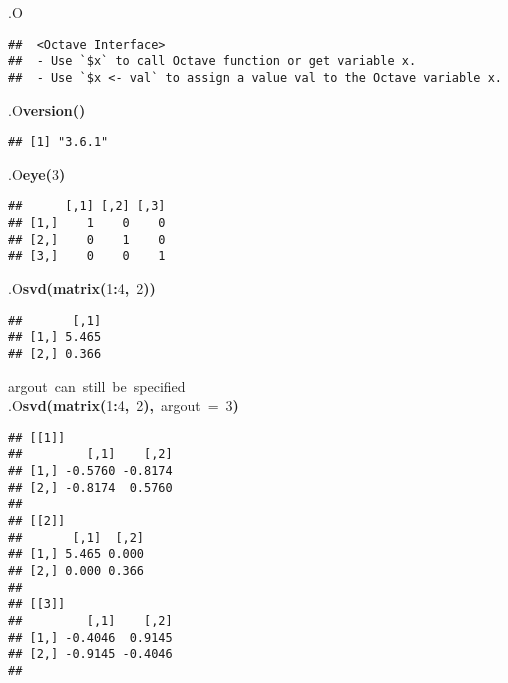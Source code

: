 \documentclass[english,10pt,a4paper]{article}\usepackage{graphicx, color}
\makeatletter
\newcommand{\hlnumber}[1]{\textcolor[rgb]{0,0,0}{#1}}%
\newcommand{\hlfunctioncall}[1]{\textcolor[rgb]{0.501960784313725,0,0.329411764705882}{\textbf{#1}}}%
\newcommand{\hlkeyword}[1]{\textcolor[rgb]{0,0,0}{\textbf{#1}}}%
\newcommand{\hlargument}[1]{\textcolor[rgb]{0.690196078431373,0.250980392156863,0.0196078431372549}{#1}}%
\newcommand{\hlcomment}[1]{\textcolor[rgb]{0.180392156862745,0.6,0.341176470588235}{#1}}%
\newcommand{\hlsymbol}[1]{\textcolor[rgb]{0,0,0}{#1}}%
\newcommand{\hlstd}[1]{\textcolor[rgb]{0,0,0}{#1}}%
\newenvironment{kframe}{%
 \def\FrameCommand##1{\hskip\@totalleftmargin \hskip-\fboxsep
 \colorbox{shadecolor}{##1}\hskip-\fboxsep
     \hskip-\linewidth \hskip-\@totalleftmargin \hskip\columnwidth}%
 \MakeFramed {\advance\hsize-\width
   \@totalleftmargin\z@ \linewidth\hsize
   \@setminipage}}%
 {\par\unskip\endMakeFramed}
\newenvironment{knitrout}{}{} %
\makeatother
\begin{document}
\begin{knitrout}
\color{fgcolor}\begin{kframe}
\begin{flushleft}
\ttfamily\noindent
\hlsymbol{.O}\mbox{}
\normalfont
\end{flushleft}
\begin{verbatim}
##  <Octave Interface>
##  - Use `$x` to call Octave function or get variable x.
##  - Use `$x <- val` to assign a value val to the Octave variable x.
\end{verbatim}
\begin{flushleft}
\ttfamily\noindent
\hlsymbol{.O}\hlkeyword{\usebox{\hlnormalsizeboxdollar}}\hlfunctioncall{version}\hlkeyword{(}\hlkeyword{)}\mbox{}
\normalfont
\end{flushleft}
\begin{verbatim}
## [1] "3.6.1"
\end{verbatim}
\begin{flushleft}
\ttfamily\noindent
\hlsymbol{.O}\hlkeyword{\usebox{\hlnormalsizeboxdollar}}\hlfunctioncall{eye}\hlkeyword{(}\hlnumber{3}\hlkeyword{)}\mbox{}
\normalfont
\end{flushleft}
\begin{verbatim}
##      [,1] [,2] [,3]
## [1,]    1    0    0
## [2,]    0    1    0
## [3,]    0    0    1
\end{verbatim}
\begin{flushleft}
\ttfamily\noindent
\hlsymbol{.O}\hlkeyword{\usebox{\hlnormalsizeboxdollar}}\hlfunctioncall{svd}\hlkeyword{(}\hlfunctioncall{matrix}\hlkeyword{(}\hlnumber{1}\hlkeyword{:}\hlnumber{4}\hlkeyword{,}{\ }\hlnumber{2}\hlkeyword{)}\hlkeyword{)}\mbox{}
\normalfont
\end{flushleft}
\begin{verbatim}
##       [,1]
## [1,] 5.465
## [2,] 0.366
\end{verbatim}
\begin{flushleft}
\ttfamily\noindent
\hlcomment{\usebox{\hlnormalsizeboxhash}{\ }argout{\ }can{\ }still{\ }be{\ }specified}\hspace*{\fill}\\
\hlstd{}\hlsymbol{.O}\hlkeyword{\usebox{\hlnormalsizeboxdollar}}\hlfunctioncall{svd}\hlkeyword{(}\hlfunctioncall{matrix}\hlkeyword{(}\hlnumber{1}\hlkeyword{:}\hlnumber{4}\hlkeyword{,}{\ }\hlnumber{2}\hlkeyword{)}\hlkeyword{,}{\ }\hlargument{argout}{\ }\hlargument{=}{\ }\hlnumber{3}\hlkeyword{)}\mbox{}
\normalfont
\end{flushleft}
\begin{verbatim}
## [[1]]
##         [,1]    [,2]
## [1,] -0.5760 -0.8174
## [2,] -0.8174  0.5760
## 
## [[2]]
##       [,1]  [,2]
## [1,] 5.465 0.000
## [2,] 0.000 0.366
## 
## [[3]]
##         [,1]    [,2]
## [1,] -0.4046  0.9145
## [2,] -0.9145 -0.4046
## 
\end{verbatim}
\end{kframe}
\end{knitrout}
\end{document}

